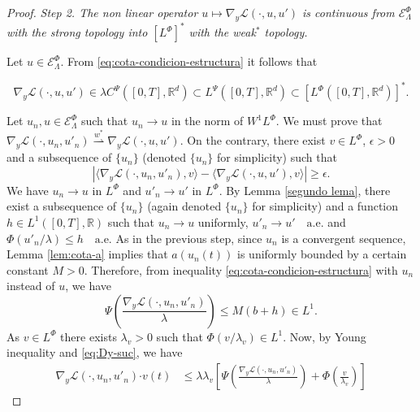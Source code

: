 \documentclass[twoside]{article}
\theoremstyle{remark}
\newcommand{\lphi}{L^{\Phi}}
\newcommand{\lpsi}{L^{\Psi}}
\newcommand{\wphi}{W^{1}\lphi}
\newcommand{\domi}{\mathcal{E}^{\Phi}}
\renewcommand{\b}[1]{\boldsymbol{#1}}
\newcommand{\rr}{\mathbb{R}}
\newcommand{\ccdot}{\b{\cdot}}
\renewcommand{\leq}{\leqslant}
\renewcommand{\geq}{\geqslant}
\begin{document}
\begin{proof}
\noindent\emph{Step 2. The non linear operator   $u
 \mapsto  \nabla_y\mathcal{L}(\cdot,u,u')$ is continuous from $\domi_{\Lambda}$ with the strong topology  
into $\left[\lphi\right]^*$  with the weak$^*$ topology.}

 Let $u\in \domi_{\Lambda}$.  From  \eqref{eq:cota-condicion-estructura} it follows that 

\begin{equation}\label{eq:DyLpsi-clase}
\nabla_y\mathcal{L}(\cdot,u,u')\in \lambda C^{\Psi}\left([0,T],\rr^d\right)\subset\lpsi\left([0,T],\rr^d\right)\subset\left[\lphi\left([0,T],\rr^d\right)\right]^*.
\end{equation}






Let $u_n,u\in \domi_{\Lambda}$ such that $u_n\to u$ in the norm of $\wphi$. 
We must prove that  $\nabla_y\mathcal{L}(\cdot,u_n,u'_n)\overset{w^*}{\rightharpoonup} 
\nabla_y\mathcal{L}(\cdot,u,u')$. 
On the contrary, there exist $v\in\lphi$, $\epsilon>0$ and a subsequence of $\{u_n\}$ (denoted  $\{u_n\}$ for simplicity)  such that
\begin{equation}\label{cota_eps}
 \left| \langle \nabla_y\mathcal{L}(\cdot,u_n,u'_n),v \rangle - 
\langle  \nabla_y\mathcal{L}(\cdot,u,u'),v \rangle\right|\geq \epsilon.
\end{equation}
We have $u_n\rightarrow u$ in $\lphi$ and
$u'_n\rightarrow u'$ in $\lphi$.
 By Lemma \ref{segundo lema}, there exist a subsequence of $\{u_n\}$ (again denoted  $\{u_n\}$ for simplicity) 
and a function $h\in L^1([0,T],\rr)$ such that 
$u_n\rightarrow u$ uniformly, $u'_n\rightarrow u' \quad\text{a.e.}$ and $\Phi(u'_n/\lambda)\leq h\quad\text{a.e.}$ 
As in the previous step, since $u_n$ is a convergent sequence, 
Lemma \ref{lem:cota-a} implies that $a(u_n(t))$ is uniformly bounded by a certain constant $M>0$. 
Therefore,   from inequality  \eqref{eq:cota-condicion-estructura} with $u_n$ instead of $u$, we have 
\begin{equation}\label{eq:Dy-suc}
  \Psi\left(\frac{\nabla_y\mathcal{L}(\cdot,u_n,u'_n)}{\lambda}\right)   
	\leq M (b+h)\in L^1.
\end{equation}
As $v \in \lphi$ there exists $\lambda_v>0$ such that $\Phi(v/\lambda_v)\in L^1$. 
Now, by Young inequality and \eqref{eq:Dy-suc}, we have
\begin{equation}\label{eq:Dy_lambda-Psi}
\begin{split}
\nabla_y\mathcal{L}(\cdot,u_{n},u'_{n})\ccdot v(t) 
&\leq 
\lambda\lambda_v\left[\Psi\left(\frac{\nabla_y\mathcal{L}(\cdot,u_{n},u'_{n})}{\lambda}\right)+\Phi\left(\frac{v}{\lambda_v}\right)\right]

\end{split}
\end{equation}
\end{proof}
\end{document}
